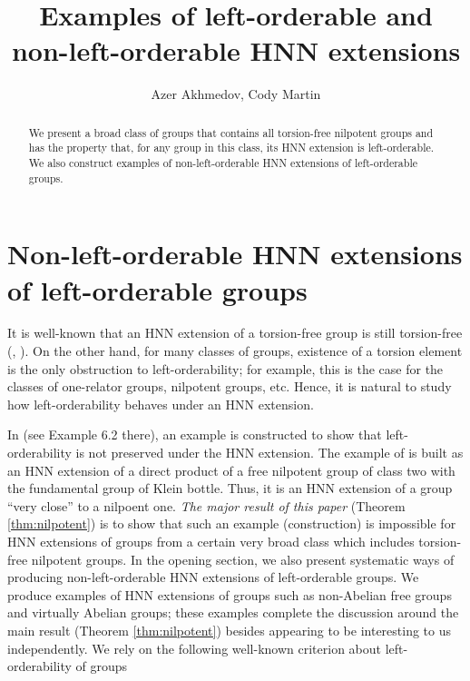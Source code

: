 \documentclass[12pt]{amsart}
\title{Examples of left-orderable and non-left-orderable HNN extensions}
\author{Azer Akhmedov, Cody Martin}
\theoremstyle{definition}
\begin{document}
 

 \maketitle

 
 
 \begin{abstract} We present a broad class of groups that contains all torsion-free nilpotent groups and has the property that, for any group in this class, its HNN extension is left-orderable. We also construct examples of non-left-orderable HNN extensions of left-orderable groups.
 \end{abstract}
 
 
 

 \section{Non-left-orderable HNN extensions of left-orderable groups}
 
 It is well-known that an HNN extension of a torsion-free group is still torsion-free (\cite{LS}, \cite{Bu}). On the other hand, for many classes of groups, existence of a torsion element is the only obstruction to left-orderability; for example, this is the case for the classes of one-relator groups, nilpotent groups, etc. Hence, it is natural to study how left-orderability behaves under an HNN extension.
 
 \medskip
 
 In \cite{BG} (see Example 6.2 there), an example is constructed to show that left-orderability is not preserved under the HNN extension. The example of \cite{BG} is built as an HNN extension of a direct product of a free nilpotent group of class two with the fundamental group of Klein bottle. Thus, it is an HNN extension of a group ``very close'' to a nilpoent one. {\em The major result of this paper} (Theorem \ref{thm:nilpotent}) is to show that such an example (construction)  is impossible for HNN extensions of groups from a certain very broad class which includes torsion-free nilpotent groups. In the opening section, we also present systematic ways of producing non-left-orderable HNN extensions of left-orderable groups. We produce examples of HNN extensions of groups such as non-Abelian free groups and virtually Abelian groups; these examples complete the discussion around the main result (Theorem \ref{thm:nilpotent}) besides appearing to be interesting to us independently. We rely on the following well-known criterion about left-orderability of groups \cite{N}
 
\end{document}
